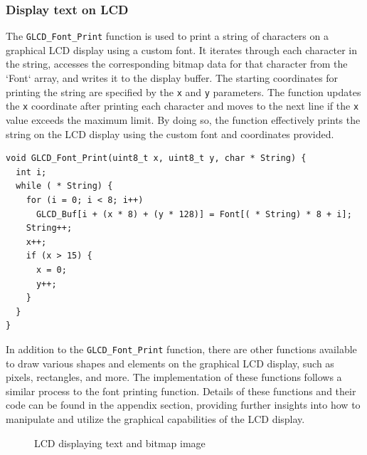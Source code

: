 \documentclass[a4paper, twoside]{report}
\begin{document}
\subsubsection{Display text on LCD}
The \texttt{GLCD\_Font\_Print} function is used to print a string of characters on a graphical LCD display using a custom font. It iterates through each character in the string, accesses the corresponding bitmap data for that character from the `Font` array, and writes it to the display buffer. The starting coordinates for printing the string are specified by the \texttt{x} and \texttt{y} parameters. The function updates the \texttt{x} coordinate after printing each character and moves to the next line if the \texttt{x} value exceeds the maximum limit. By doing so, the function effectively prints the string on the LCD display using the custom font and coordinates provided.

\begin{verbatim}
void GLCD_Font_Print(uint8_t x, uint8_t y, char * String) {
  int i;
  while ( * String) {
    for (i = 0; i < 8; i++)
      GLCD_Buf[i + (x * 8) + (y * 128)] = Font[( * String) * 8 + i];
    String++;
    x++;
    if (x > 15) {
      x = 0;
      y++;
    }
  }
}
\end{verbatim}

In addition to the \texttt{GLCD\_Font\_Print} function, there are other functions available to draw various shapes and elements on the graphical LCD display, such as pixels, rectangles, and more. The implementation of these functions follows a similar process to the font printing function. Details of these functions and their code can be found in the appendix section, providing further insights into how to manipulate and utilize the graphical capabilities of the LCD display.

\begin{figure}[H]
    \centering
     \qquad
    \caption{LCD displaying text and bitmap image}
\end{figure}
\end{document}

